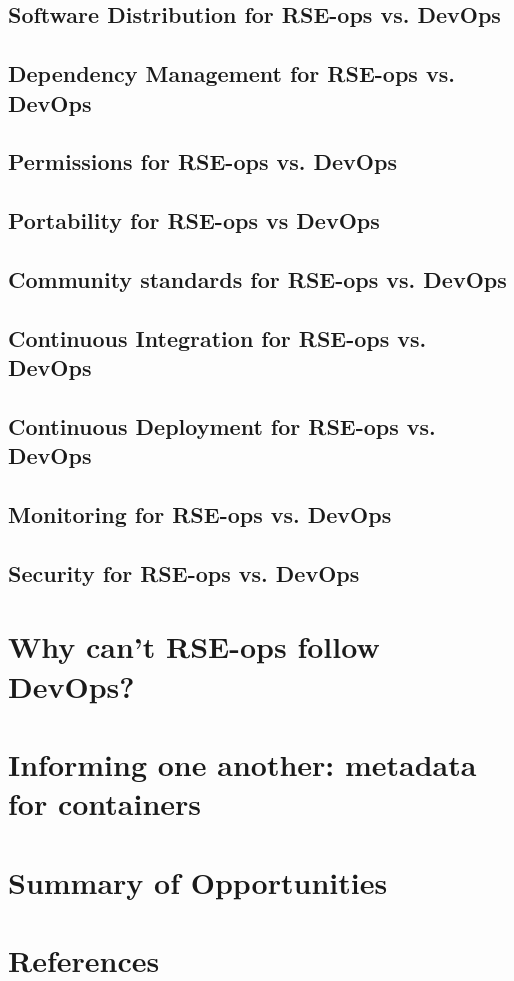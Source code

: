 \documentclass{article}
\begin{document}
\subsection{Software Distribution for RSE-ops vs. DevOps}


\subsection{Dependency Management for RSE-ops vs. DevOps}


\subsection{Permissions for RSE-ops vs. DevOps}


\subsection{Portability for RSE-ops vs DevOps}


\subsection{Community standards for RSE-ops vs. DevOps}


\subsection{Continuous Integration for RSE-ops vs. DevOps}


\subsection{Continuous Deployment for RSE-ops vs. DevOps}


\subsection{Monitoring for RSE-ops vs. DevOps}


\subsection{Security for RSE-ops vs. DevOps}




\section{Why can't RSE-ops follow DevOps?}


\section{Informing one another: metadata for containers}




\section{Summary of Opportunities}


\section{References}


\end{document}
